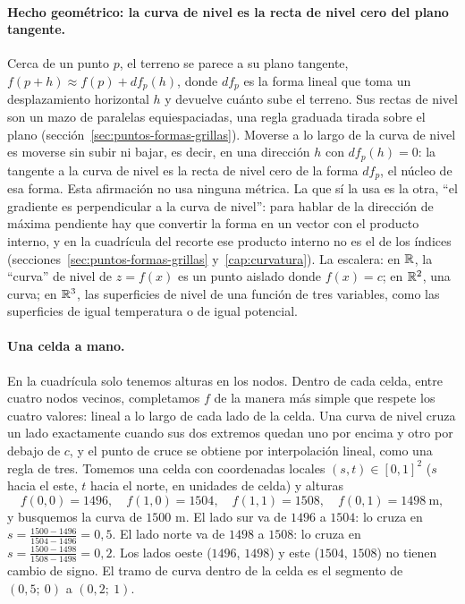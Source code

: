 \paragraph{Hecho geométrico: la curva de nivel es la recta de nivel cero del plano
tangente.} Cerca de un punto \(p\), el terreno se parece a su plano tangente,
\(f(p+h)\approx f(p)+df_p(h)\), donde \(df_p\) es la forma lineal que toma un desplazamiento
horizontal \(h\) y devuelve cuánto sube el terreno. Sus rectas de nivel son un mazo de
paralelas equiespaciadas, una regla graduada tirada sobre el plano
(sección~\ref{sec:puntos-formas-grillas}). Moverse a lo largo de la curva de nivel es moverse
sin subir ni bajar, es decir, en una dirección \(h\) con \(df_p(h)=0\): la tangente a la curva
de nivel es la recta de nivel cero de la forma \(df_p\), el núcleo de esa forma. Esta
afirmación no usa ninguna métrica. La que sí la usa es la otra, \enquote{el gradiente es perpendicular
a la curva de nivel}: para hablar de la dirección de máxima pendiente hay que convertir la
forma en un vector con el producto interno, y en la cuadrícula del recorte ese producto interno no es
el de los índices (secciones~\ref{sec:puntos-formas-grillas} y~\ref{cap:curvatura}). La
escalera: en \(\mathbb{R}\), la \enquote{curva} de nivel de \(z=f(x)\) es un punto aislado donde
\(f(x)=c\); en \(\mathbb{R}^2\), una curva; en \(\mathbb{R}^3\), las superficies de nivel de una función de
tres variables, como las superficies de igual temperatura o de igual potencial.

\paragraph{Una celda a mano.} En la cuadrícula solo tenemos alturas en los nodos. Dentro de cada
celda, entre cuatro nodos vecinos, completamos \(f\) de la manera más simple que respete los
cuatro valores: lineal a lo largo de cada lado de la celda. Una curva de nivel cruza un lado
exactamente cuando sus dos extremos quedan uno por encima y otro por debajo de \(c\), y el
punto de cruce se obtiene por interpolación lineal, como una regla de tres. Tomemos una celda
con coordenadas locales \((s,t)\in[0,1]^2\) (\(s\) hacia el este, \(t\) hacia el norte, en
unidades de celda) y alturas
\[
  f(0,0)=1496,\quad f(1,0)=1504,\quad f(1,1)=1508,\quad f(0,1)=1498\ \text{m},
\]
y busquemos la curva de \(1500\) m. El lado sur va de \(1496\) a \(1504\): lo cruza en
\(s=\frac{1500-1496}{1504-1496}=0{,}5\). El lado norte va de \(1498\) a \(1508\): lo cruza en
\(s=\frac{1500-1498}{1508-1498}=0{,}2\). Los lados oeste (\(1496\), \(1498\)) y este
(\(1504\), \(1508\)) no tienen cambio de signo. El tramo de curva dentro de la celda es el
segmento de \((0{,}5;\ 0)\) a \((0{,}2;\ 1)\).

